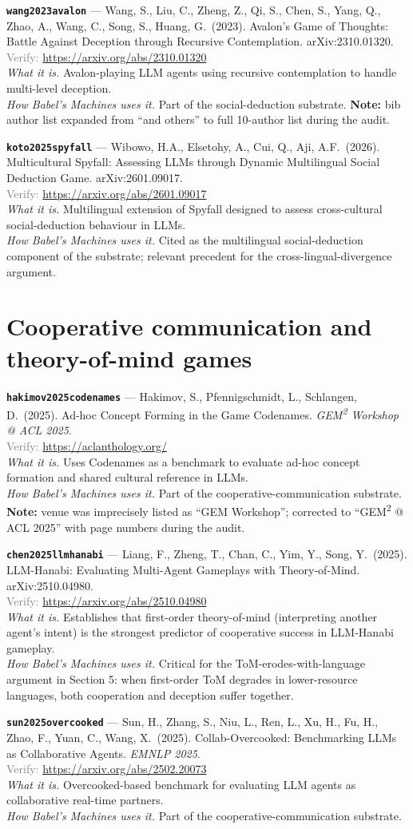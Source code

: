 \documentclass[11pt,a4paper]{article}
\newcommand{\entry}[5]{%
  \par\smallskip
  \noindent\textbf{\texttt{#1}} --- #2\\
  {\footnotesize \textcolor{gray}{Verify:} \url{#3}}\\
  \textit{What it is.} #4\\
  \textit{How Babel's Machines uses it.} #5
  \par\medskip
}
\begin{document}
\entry{wang2023avalon}
{Wang, S., Liu, C., Zheng, Z., Qi, S., Chen, S., Yang, Q., Zhao, A., Wang, C., Song, S., Huang, G.\ (2023). Avalon's Game of Thoughts: Battle Against Deception through Recursive Contemplation. arXiv:2310.01320.}
{https://arxiv.org/abs/2310.01320}
{Avalon-playing LLM agents using recursive contemplation to handle multi-level deception.}
{Part of the social-deduction substrate. \textbf{Note:} bib author list expanded from ``and others'' to full 10-author list during the audit.}

\entry{koto2025spyfall}
{Wibowo, H.A., Elsetohy, A., Cui, Q., Aji, A.F.\ (2026). Multicultural Spyfall: Assessing LLMs through Dynamic Multilingual Social Deduction Game. arXiv:2601.09017.}
{https://arxiv.org/abs/2601.09017}
{Multilingual extension of Spyfall designed to assess cross-cultural social-deduction behaviour in LLMs.}
{Cited as the multilingual social-deduction component of the substrate; relevant precedent for the cross-lingual-divergence argument.}

\section{Cooperative communication and theory-of-mind games}

\entry{hakimov2025codenames}
{Hakimov, S., Pfennigschmidt, L., Schlangen, D.\ (2025). Ad-hoc Concept Forming in the Game Codenames. \emph{GEM\textsuperscript{2} Workshop @ ACL 2025}.}
{https://aclanthology.org/}
{Uses Codenames as a benchmark to evaluate ad-hoc concept formation and shared cultural reference in LLMs.}
{Part of the cooperative-communication substrate. \textbf{Note:} venue was imprecisely listed as ``GEM Workshop''; corrected to ``GEM\textsuperscript{2} @ ACL 2025'' with page numbers during the audit.}

\entry{chen2025llmhanabi}
{Liang, F., Zheng, T., Chan, C., Yim, Y., Song, Y.\ (2025). LLM-Hanabi: Evaluating Multi-Agent Gameplays with Theory-of-Mind. arXiv:2510.04980.}
{https://arxiv.org/abs/2510.04980}
{Establishes that first-order theory-of-mind (interpreting another agent's intent) is the strongest predictor of cooperative success in LLM-Hanabi gameplay.}
{Critical for the ToM-erodes-with-language argument in Section 5: when first-order ToM degrades in lower-resource languages, both cooperation and deception suffer together.}

\entry{sun2025overcooked}
{Sun, H., Zhang, S., Niu, L., Ren, L., Xu, H., Fu, H., Zhao, F., Yuan, C., Wang, X.\ (2025). Collab-Overcooked: Benchmarking LLMs as Collaborative Agents. \emph{EMNLP 2025}.}
{https://arxiv.org/abs/2502.20073}
{Overcooked-based benchmark for evaluating LLM agents as collaborative real-time partners.}
{Part of the cooperative-communication substrate.}
\end{document}
